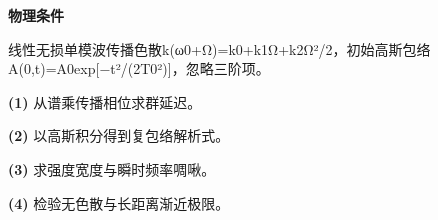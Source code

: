 \textbf{物理条件}\par 线性无损单模波传播色散k(ω0+Ω)=k0+k1Ω+k2Ω²/2，初始高斯包络A(0,t)=A0exp[−t²/(2T0²)]，忽略三阶项。
\par\noindent\textbf{(1)} 从谱乘传播相位求群延迟。
\par\noindent\textbf{(2)} 以高斯积分得到复包络解析式。
\par\noindent\textbf{(3)} 求强度宽度与瞬时频率啁啾。
\par\noindent\textbf{(4)} 检验无色散与长距离渐近极限。
